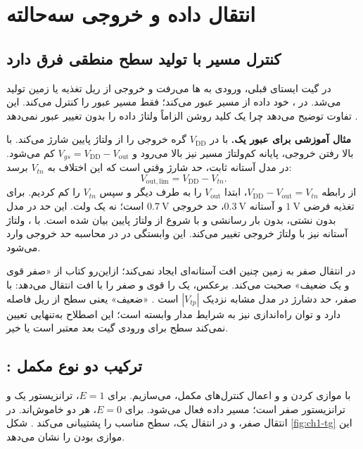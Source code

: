 \section{انتقال داده و خروجی سه‌حالته}
\label{sec:ch1-pass}
\subsection{کنترل مسیر با تولید سطح منطقی فرق دارد}
در گیت ایستای قبلی، ورودی به ها می‌رفت و خروجی از ریل تغذیه یا زمین
تولید می‌شد. در ، خود داده از مسیر 
عبور می‌کند؛  فقط مسیر عبور را کنترل می‌کند.
این تفاوت توضیح می‌دهد چرا یک کلید روشن الزاماً ولتاژ داده را بدون تغییر عبور نمی‌دهد
\cite[بخش ]{weste}.

\textbf{مثال آموزشی برای عبور یک.}  با  در
\(V_{\mathrm{DD}}\) گره خروجی را از ولتاژ پایین شارژ می‌کند.
با بالا رفتن خروجی، پایانه کم‌ولتاژ مسیر نیز بالا می‌رود و
\(V_{gs}=V_{\mathrm{DD}}-V_{\mathrm{out}}\) کم می‌شود.
در مدل آستانه ثابت، حد شارژ وقتی است که این اختلاف به \(V_{tn}\) برسد:
\begin{equation}\label{eq:ch1-pass-high}
V_{\mathrm{out,lim}}=V_{\mathrm{DD}}-V_{tn}.
\end{equation}
از رابطه \(V_{\mathrm{DD}}-V_{\mathrm{out}}=V_{tn}\)،
ابتدا \(V_{\mathrm{out}}\) را به طرف دیگر و سپس \(V_{tn}\) را کم کردیم.
برای تغذیه فرضی \(\qty{1}{\volt}\) و آستانه \(\qty{0.3}{\volt}\)،
حد خروجی \(\qty{0.7}{\volt}\) است؛ نه یک ولت.
این حد در مدل بدون نشتی، بدون بار رسانشی و با شروع از ولتاژ پایین بیان شده است.
با ، ولتاژ آستانه نیز با ولتاژ خروجی تغییر می‌کند.
این وابستگی در 
در محاسبه حد خروجی وارد می‌شود.

 در انتقال صفر به زمین چنین افت آستانه‌ای ایجاد نمی‌کند؛
ازاین‌رو کتاب از «صفر قوی و یک ضعیف» صحبت می‌کند.
 برعکس، یک را قوی و صفر را با افت انتقال می‌دهد:
با  صفر، حد دشارژ در مدل مشابه نزدیک \(|V_{tp}|\) است
\cite[شکل ]{weste}.
«ضعیف» یعنی سطح از ریل فاصله دارد و توان راه‌اندازی نیز به شرایط مدار وابسته است؛
این اصطلاح به‌تنهایی تعیین نمی‌کند سطح برای ورودی گیت بعد معتبر است یا خیر.

\subsection{: ترکیب دو نوع مکمل}
با موازی کردن  و  و اعمال کنترل‌های مکمل،
 می‌سازیم. برای \(E=1\)،
 ترانزیستور  یک و  ترانزیستور 
صفر است؛ مسیر داده فعال می‌شود. برای \(E=0\)، هر دو خاموش‌اند.
در انتقال صفر،  و در انتقال یک،  سطح مناسب را پشتیبانی می‌کند
\cite[شکل ]{weste}.
شکل \ref{fig:ch1-tg} این موازی بودن را نشان می‌دهد.


